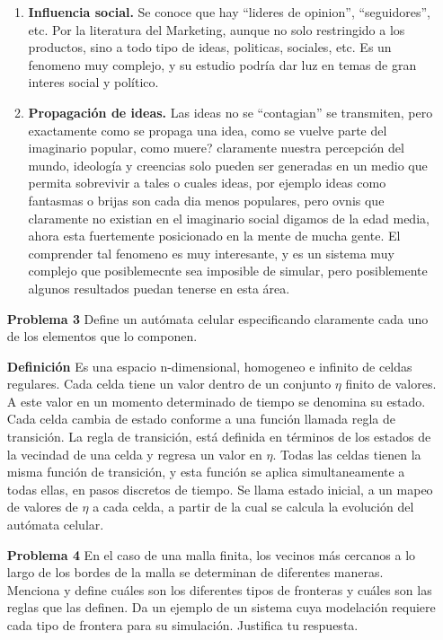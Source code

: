 \documentclass{article}
\begin{document}
\begin{enumerate}
\begin{enumerate}
\item {\bf Influencia social.}
Se conoce que hay ``lideres de opinion'', ``seguidores'', etc. Por la literatura del Marketing, aunque no solo restringido a los productos, sino a todo tipo de ideas, politicas, sociales, etc. Es un fenomeno muy complejo, y su estudio podría dar luz en temas de gran interes social y político.

\item {\bf Propagación de ideas.}
Las ideas no se ``contagian'' se transmiten, pero exactamente como se propaga una idea, como se vuelve parte del imaginario popular, como muere? claramente nuestra percepción del mundo, ideología y creencias solo pueden ser generadas en un medio que permita sobrevivir a tales o cuales ideas, por ejemplo ideas como fantasmas o brijas son cada dia menos populares, pero ovnis que claramente no existian en el imaginario social digamos de la edad media, ahora esta fuertemente posicionado en la mente de mucha gente. El comprender tal fenomeno es muy interesante, y es un sistema muy complejo que posiblemecnte sea imposible de simular, pero posiblemente algunos resultados puedan tenerse en esta área.
\end{enumerate}

\item[\bf{Problema 3}] Define un autómata celular especificando claramente cada uno de los elementos que lo componen.

\item[\bf{Definición}]
Es una espacio n-dimensional, homogeneo e infinito de celdas regulares.
Cada celda tiene un valor dentro de un conjunto $\eta$ finito de valores.
A este valor en un momento determinado de tiempo se denomina su estado.
Cada celda cambia de estado conforme a una función llamada regla de transición.
La regla de transición, está definida en términos de los estados de la vecindad de una celda y regresa un valor en $\eta$.
Todas las celdas tienen la misma función de transición, y esta función se aplica simultaneamente a todas ellas, en pasos discretos de tiempo.
Se llama estado inicial, a un mapeo de valores de $\eta$ a cada celda, a partir de la cual se calcula la evolución del autómata celular.

\item[\bf{Problema 4}] En el caso de una malla finita, los vecinos más cercanos a lo largo de los bordes de la malla se determinan de diferentes maneras. Menciona y define cuáles son los diferentes tipos de fronteras y cuáles son las reglas que las definen. Da un ejemplo de un sistema cuya modelación requiere cada tipo de frontera para su simulación. Justifica tu respuesta.


\end{enumerate}
\end{document}
